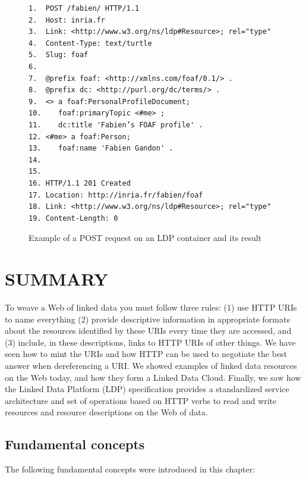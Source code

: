 \begin{figure}
  
    \label{fig:ch5.18}
\begin{lstlisting}
1.	POST /fabien/ HTTP/1.1
2.	Host: inria.fr
3.	Link: <http://www.w3.org/ns/ldp#Resource>; rel="type"
4.	Content-Type: text/turtle
5.	Slug: foaf
6.	
7.	@prefix foaf: <http://xmlns.com/foaf/0.1/> .
8.	@prefix dc: <http://purl.org/dc/terms/> .
9.	<> a foaf:PersonalProfileDocument;
10.	   foaf:primaryTopic <#me> ;
11.    dc:title 'Fabien’s FOAF profile' .
12.	<#me> a foaf:Person;
13.	   foaf:name 'Fabien Gandon' .
14.	 
15.	 
16.	HTTP/1.1 201 Created
17.	Location: http://inria.fr/fabien/foaf
18.	Link: <http://www.w3.org/ns/ldp#Resource>; rel="type"
19.	Content-Length: 0

\end{lstlisting}
  \caption{Example of a POST request on an LDP container and its result}
  \end{figure}

\hypertarget{summary}{%

\section{SUMMARY}\label{summary:ch5}}

To weave a Web of linked data you must follow three rules: (1) use HTTP
URIs to name everything (2) provide descriptive information in
appropriate formats about the resources identified by these URIs every
time they are accessed, and (3) include, in these descriptions, links to
HTTP URIs of other things. We have seen how to mint the URIs and how
HTTP can be used to negotiate the best answer when dereferencing a URI.
We showed examples of linked data resources on the Web today, and how they form
a Linked Data Cloud. 
Finally, we saw how
the Linked Data Platform (LDP) specification provides a standardized service
architecture and set of operations based on HTTP verbs to read and write
resources and resource descriptions on the Web of data.

\hypertarget{fundamental-concepts}{%
\subsection{Fundamental concepts}\label{fundamental-concepts}}

The following fundamental concepts were introduced in this chapter:

